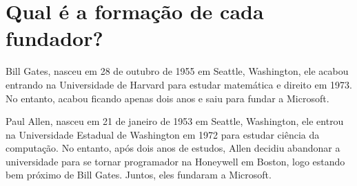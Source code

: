\section{Qual é a formação de cada fundador?}
Bill Gates, nasceu em 28 de outubro de 1955 em Seattle, Washington, ele acabou entrando na Universidade de Harvard para estudar matemática e direito em 1973. No entanto, acabou ficando apenas dois anos e saiu para fundar a Microsoft.

Paul Allen, nasceu em 21 de janeiro de 1953 em Seattle, Washington, ele entrou na Universidade Estadual de Washington em 1972 para estudar ciência da computação. No entanto, após dois anos de estudos, Allen decidiu abandonar a universidade para se tornar programador na Honeywell em Boston, logo estando bem próximo de Bill Gates. Juntos, eles fundaram a Microsoft.